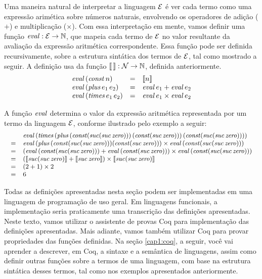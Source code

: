 \begin{Definition}\label{def:sem:Exp}
Uma maneira natural de interpretar a linguagem $\mathcal{E}$ é ver cada termo como uma  expressão arimética sobre números naturais, envolvendo os operadores de adição ($+$) e multiplicação ($\times$). Com essa interpretação em mente, vamos definir uma função $\textit{eval\/} : \mathcal{E} \rightarrow \mathbb{N}$, que mapeia cada termo de $\mathcal{E}$ no valor resultante da avaliação da expressão aritmética correspondente. Essa função pode ser definida recursivamente, sobre a estrutura sintática dos termos de $\mathcal{E}$, tal como mostrado a seguir. A definição usa da função  $\llbracket\,\rrbracket : \mathcal{N} \rightarrow \mathbb{N}$, definida anteriormente.
\[
\begin{array}{lcl}
\textit{eval\/}\, (\textit{const\/}\, n)  & = & \llbracket n \rrbracket \\
\textit{eval\/}\, (\textit{plus\/}\,e_1\,e_2) & = & \textit{eval\/}\,e_1 + \textit{eval\/}\,e_2 \\
\textit{eval\/}\, (\textit{times\/}\,e_1\,e_2) & = & \textit{eval\/}\,e_1 \times \textit{eval\/}\,e_2 \\
\end{array}
\]
\end{Definition}
A função $\textit{eval\/}$ determina o valor da expressão aritmética representada por um termo da linguagem $\mathcal{E}$, conforme ilustrado pelo exemplo a seguir:
\[ \small{
\begin{array}{ll}
&\textit{eval\/}\, (\textit{times\/}\,(\textit{plus\/}\,(\textit{const\/}(\textit{suc\/}(\textit{suc\/}\,\textit{zero\/})))\, (\textit{const\/}(\textit{suc\/}\,\textit{zero\/})))\, (\textit{const\/}(\textit{suc\/}(\textit{suc\/}\,\textit{zero\/})))) \\
= & \textit{eval\/}\, (\textit{plus\/}\,(\textit{const\/}(\textit{suc\/}(\textit{suc\/}\,\textit{zero\/}))) (\textit{const\/}(\textit{suc\/}\,\textit{zero\/}))) \times \textit{eval\/}\, (\textit{const\/}(\textit{suc\/}(\textit{suc\/}\, \textit{zero\/})))  \\
=  & (\textit{eval\/}\, (\textit{const\/}(\textit{suc\/}(\textit{suc\/}\,\textit{zero\/}))) + \textit{eval\/}\,  (\textit{const\/}(\textit{suc\/}\,\textit{zero\/}))) \times \textit{eval\/}\, (\textit{const\/}(\textit{suc\/}(\textit{suc\/}\, \textit{zero\/}))) \\
=  & (\llbracket \textit{suc\/}(\textit{suc\/}\,\textit{zero\/}) \rrbracket + \llbracket  \textit{suc\/}\,\textit{zero\/}\rrbracket) \times \llbracket \textit{suc\/}(\textit{suc\/}\,\textit{zero\/}) \rrbracket \\
=  & (2 + 1) \times 2 \\
= & 6 
\end{array}}
\]

Todas as defini\c{c}\~oes apresentadas nesta se\c{c}\~ao podem ser implementadas em uma linguagem de programação de uso geral. Em linguagens funcionais, a implementação seria praticamente uma transcrição das definições apresentadas. Neste texto, vamos utilizar o assistente de provas Coq para implementação das definições apresentadas. Mais adiante, vamos também utilizar Coq para provar propriedades das funções definidas. 
Na se\c{c}\~ao \ref{cap1:coq}, a seguir, você vai aprender a descrever, em Coq, a sintaxe e a semântica de linguagens, assim como definir outras funções sobre a termos de uma linguagem, com base na estrutura sint\'atica desses termos, tal como nos exemplos apresentados anteriormente.

